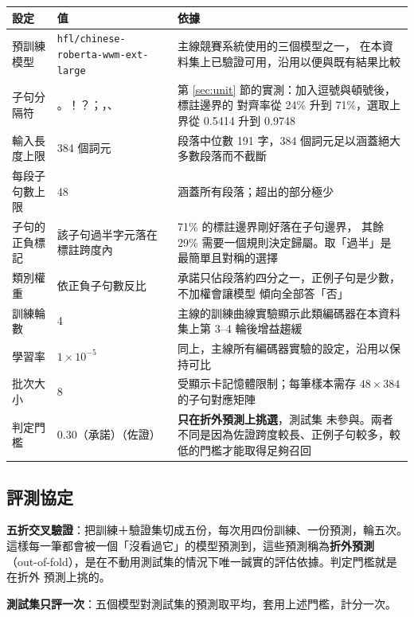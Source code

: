 \documentclass[11pt,a4paper]{ctexart}
\newcommand{\fn}[1]{\texttt{#1}}
\begin{document}
\begin{table}[h]
\centering\small
\begin{tabular}{@{}p{3.3cm}p{3cm}p{7.6cm}@{}}
\toprule
設定 & 值 & 依據 \\
\midrule
預訓練模型 & \fn{hfl/chinese-roberta-wwm-ext-large} & 主線競賽系統使用的三個模型之一，
在本資料集上已驗證可用，沿用以便與既有結果比較 \\
\addlinespace
子句分隔符 & 。！？；，、 & 第 \ref{sec:unit} 節的實測：加入逗號與頓號後，標註邊界的
對齊率從 24\% 升到 71\%，選取上界從 0.5414 升到 0.9748 \\
\addlinespace
輸入長度上限 & 384 個詞元 & 段落中位數 191 字，384 個詞元足以涵蓋絕大多數段落而不截斷 \\
\addlinespace
每段子句數上限 & 48 & 涵蓋所有段落；超出的部分極少 \\
\addlinespace
子句的正負標記 & 該子句過半字元落在標註跨度內 & 71\% 的標註邊界剛好落在子句邊界，
其餘 29\% 需要一個規則決定歸屬。取「過半」是最簡單且對稱的選擇 \\
\addlinespace
類別權重 & 依正負子句數反比 & 承諾只佔段落約四分之一，正例子句是少數，不加權會讓模型
傾向全部答「否」 \\
\addlinespace
訓練輪數 & 4 & 主線的訓練曲線實驗顯示此類編碼器在本資料集上第 3--4 輪後增益趨緩 \\
\addlinespace
學習率 & $1\times10^{-5}$ & 同上，主線所有編碼器實驗的設定，沿用以保持可比 \\
\addlinespace
批次大小 & 8 & 受顯示卡記憶體限制；每筆樣本需存 $48\times384$ 的子句對應矩陣 \\
\addlinespace
判定門檻 & 0.30（承諾）\newline 0.15（佐證） & \textbf{只在折外預測上挑選}，測試集
未參與。兩者不同是因為佐證跨度較長、正例子句較多，較低的門檻才能取得足夠召回 \\
\bottomrule
\end{tabular}
\end{table}

\subsection{評測協定}

\textbf{五折交叉驗證}：把訓練＋驗證集切成五份，每次用四份訓練、一份預測，輪五次。
這樣每一筆都會被一個「沒看過它」的模型預測到，這些預測稱為\textbf{折外預測}
（out-of-fold），是在不動用測試集的情況下唯一誠實的評估依據。判定門檻就是在折外
預測上挑的。

\textbf{測試集只評一次}：五個模型對測試集的預測取平均，套用上述門檻，計分一次。
\end{document}

